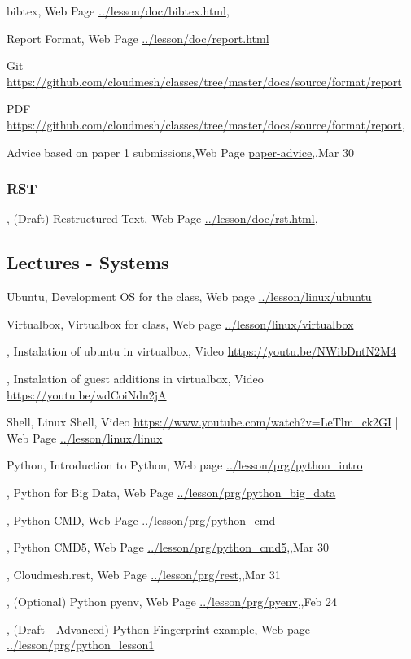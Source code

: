 bibtex, Web Page \url{../lesson/doc/bibtex.html},

Report Format, Web Page \url{../lesson/doc/report.html} 

Git \url{https://github.com/cloudmesh/classes/tree/master/docs/source/format/report}

PDF \url{https://github.com/cloudmesh/classes/tree/master/docs/source/format/report},

Advice based on paper 1 submissions,Web Page \url{paper-advice},,Mar 30



\subsubsection{RST}
, (Draft) Restructured Text, Web Page \url{../lesson/doc/rst.html},


\subsection{Lectures - Systems}\label{lectures---systems}

Ubuntu, Development OS for the class, Web page \url{../lesson/linux/ubuntu}

Virtualbox, Virtualbox for class, Web page \url{../lesson/linux/virtualbox}

  , Instalation of ubuntu in virtualbox, Video \url{https://youtu.be/NWibDntN2M4}

  , Instalation of guest additions in virtualbox, Video \url{https://youtu.be/wdCoiNdn2jA}

Shell, Linux Shell, Video \url{https://www.youtube.com/watch?v=LeTlm_ck2GI} | Web Page \url{../lesson/linux/linux}

Python, Introduction to Python, Web page \url{../lesson/prg/python_intro}

      , Python for Big Data, Web Page \url{../lesson/prg/python_big_data}

      , Python CMD, Web Page \url{../lesson/prg/python_cmd}

      , Python CMD5, Web Page \url{../lesson/prg/python_cmd5},,Mar 30

      , Cloudmesh.rest, Web Page \url{../lesson/prg/rest},,Mar 31     

      , (Optional) Python pyenv, Web Page \url{../lesson/prg/pyenv},,Feb 24

      , (Draft - Advanced) Python Fingerprint example, Web page \url{../lesson/prg/python_lesson1}

